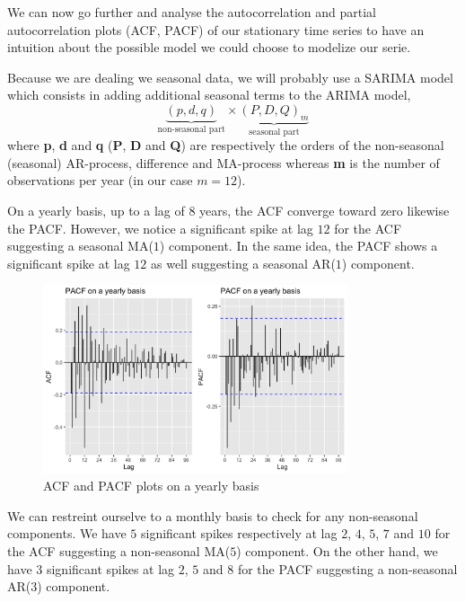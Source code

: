 We can now go further and analyse the autocorrelation and partial autocorrelation plots (ACF, PACF) of our stationary time series to have an intuition about the possible model we could choose to modelize our serie.

Because we are dealing we seasonal data, we will probably use a SARIMA model which consists in adding additional seasonal terms to the ARIMA model, 
\begin{equation}
	\underbrace{(p, d, q)}_{\text{non-seasonal part}} \times \underbrace{(P, D, Q)_m}_{\text{seasonal part}}
\end{equation} 
where \textbf{p}, \textbf{d} and \textbf{q} (\textbf{P}, \textbf{D} and \textbf{Q}) are respectively the orders of the non-seasonal (seasonal) AR-process, difference and MA-process whereas \textbf{m} is the number of observations per year (in our case $m = 12$).

On a yearly basis, up to a lag of $8$ years, the ACF converge toward zero likewise the PACF. However, we notice a significant spike at lag $12$ for the ACF suggesting a seasonal MA($1$) component. In the same idea, the PACF shows a significant spike at lag $12$ as well suggesting a seasonal AR($1$) component.

\begin{figure}[H]
	\centering
	\includegraphics[width=0.8\textwidth]{figures/box_jenkins/yearly_acf_pacf.png}
	\caption{ACF and PACF plots on a yearly basis}
	\label{fig:yearly-acf-pacf}
\end{figure}

We can restreint ourselve to a monthly basis to check for any non-seasonal components. We have $5$ significant spikes respectively at lag $2$, $4$, $5$, $7$ and $10$ for the ACF suggesting a non-seasonal MA($5$) component. On the other hand, we have $3$ significant spikes at lag $2$, $5$ and $8$ for the PACF suggesting a non-seasonal AR($3$) component. 

